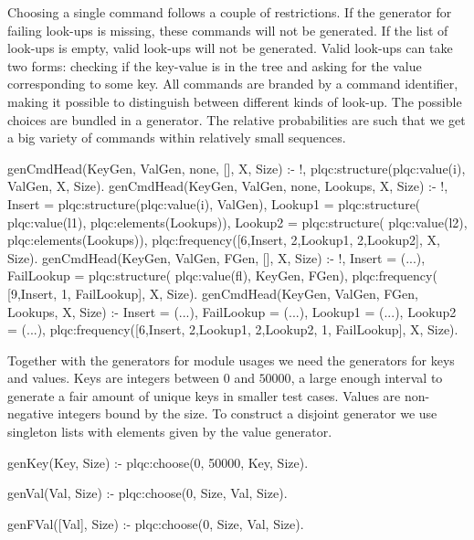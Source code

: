 Choosing a single command follows a couple of restrictions.
%
If the generator for failing look-ups is missing, these commands will
not be generated.
%
If the list of look-ups is empty, valid look-ups will not be generated.
%
Valid look-ups can take two forms: checking if the key-value is in the
tree and asking for the value corresponding to some key.
%
All commands are branded by a command identifier, making it possible to
distinguish between different kinds of look-up.
%
The possible choices are bundled in a  generator.
%
The relative probabilities are such that we get a big variety of commands within
relatively small sequences.
%
\begin{yapcode}
 genCmdHead(KeyGen, ValGen, none,
           [], X, Size) :- !,
   plqc:structure({plqc:value(i), ValGen},
                  X, Size).
 genCmdHead(KeyGen, ValGen, none,
            Lookups, X, Size) :- !,
   Insert =
     plqc:structure({plqc:value(i), ValGen}),
   Lookup1 = plqc:structure(
     {plqc:value(l1), plqc:elements(Lookups)}),
   Lookup2 = plqc:structure(
     {plqc:value(l2), plqc:elements(Lookups)}),
   plqc:frequency([{6,Insert}, {2,Lookup1},
       {2,Lookup2}], X, Size).
 genCmdHead(KeyGen, ValGen, FGen,
            [], X, Size) :- !,
   Insert = (...),
   FailLookup = plqc:structure(
     {plqc:value(fl), {KeyGen, FGen}}),
   plqc:frequency(
     [{9,Insert}, {1, FailLookup}], X, Size).
 genCmdHead(KeyGen, ValGen, FGen,
            Lookups, X, Size) :-
   Insert = (...), FailLookup = (...),
   Lookup1 = (...), Lookup2 = (...),
   plqc:frequency([{6,Insert}, {2,Lookup1},
      {2,Lookup2}, {1, FailLookup}], X, Size).
\end{yapcode}


Together with the generators for module usages we need the generators
for keys and values.
%
Keys are integers between $0$ and $50000$, a large enough interval to
generate a fair amount of unique keys in smaller test cases.
%
Values are non-negative integers bound by the size.
%
To construct a disjoint generator we use singleton lists with elements
given by the value generator.
\begin{yapcode}
 genKey(Key, Size) :-
   plqc:choose(0, 50000, Key, Size).

 genVal(Val, Size) :-
   plqc:choose(0, Size, Val, Size).

 genFVal([Val], Size) :-
   plqc:choose(0, Size, Val, Size).
\end{yapcode}

